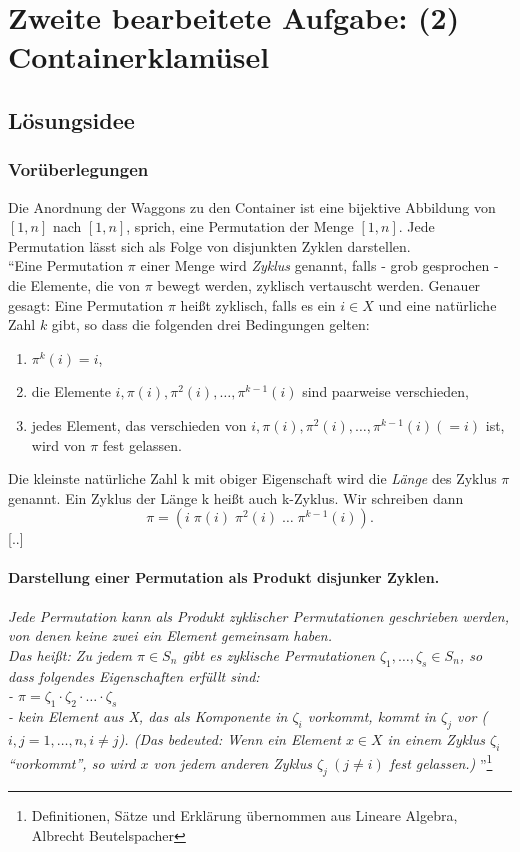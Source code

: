 \section{Zweite bearbeitete Aufgabe: (2) Containerklamüsel}
\subsection{Lösungsidee}
\subsubsection{Vorüberlegungen}
Die Anordnung der Waggons zu den Container ist eine bijektive Abbildung von $[1,n]$ nach $[1,n]$, sprich, eine Permutation der Menge $[1,n]$.
Jede Permutation lässt sich als Folge von disjunkten Zyklen darstellen. \\ %
``Eine Permutation $\pi$ einer Menge wird \emph{Zyklus} genannt, falls - grob gesprochen - die Elemente, die von $\pi$ bewegt werden,
zyklisch vertauscht werden. Genauer gesagt: Eine Permutation $\pi$ heißt zyklisch,
falls es ein $ i \in X$ und eine natürliche Zahl $k$ gibt, so dass die folgenden drei Bedingungen gelten:
\begin{enumerate}
 \item $\pi^k(i) = i$,
 \item die Elemente $i,\pi(i),\pi^2(i),\dots,\pi^{k-1}(i)$ sind paarweise verschieden,
 \item jedes Element, das verschieden von $i,\pi(i),\pi^2(i),\dots,\pi^{k-1}(i) (=i)$ ist, wird von $\pi$ fest gelassen.
\end{enumerate}
Die kleinste natürliche Zahl k mit obiger Eigenschaft wird die \emph{Länge} des Zyklus $\pi$ genannt.
Ein Zyklus der Länge k heißt auch k-Zyklus. Wir schreiben dann \[\pi=(i\;\pi(i)\;\pi^2(i) \; \dots \;\pi^{k-1}(i)).\]
[..]
\paragraph{Darstellung einer Permutation als Produkt disjunker Zyklen.}
\emph{Jede Permutation kann als Produkt zyklischer Permutationen geschrieben werden, von denen keine zwei ein Element gemeinsam haben.}\\
\emph{Das heißt: Zu jedem $\pi \in S_n$ gibt es zyklische Permutationen $\zeta_1,\dots,\zeta_s \in S_n$,
so dass folgendes Eigenschaften erfüllt sind: \\
 - $\pi=\zeta_1\cdot \zeta_2 \cdot \ldots \cdot \zeta_s$ \\
 - kein Element aus X, das als Komponente in $\zeta_i$ vorkommt, kommt in $\zeta_j$ vor ($i,j=1,\dots,n, i \neq j$).
(Das bedeuted: Wenn ein Element $x \in X$ in einem Zyklus $\zeta_i$ ``vorkommt'',
 so wird $x$ von jedem anderen Zyklus $\zeta_j \: (j \neq i)$ fest gelassen.)
}''\footnote{Definitionen, Sätze und Erklärung übernommen aus Lineare Algebra, Albrecht Beutelspacher}\\

